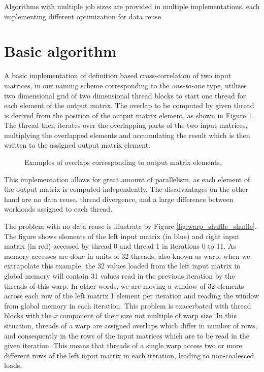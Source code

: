 Algorithms with multiple job sizes are provided in multiple implementations, each implementing different optimization for data reuse.


\section{Basic algorithm}

A basic implementation of definition based cross-correlation of two input matrices, in our naming scheme corresponding to the \textit{one-to-one} type, utilizes two dimensional grid of two dimensional thread blocks to start one thread for each element of the output matrix. The overlap to be computed by given thread is derived from the position of the output matrix element, as shown in Figure \ref{fig:basic_algorithm_overlaps}. The thread then iterates over the overlapping parts of the two input matrices, multiplying the overlapped elements and accumulating the result which is then written to the assigned output matrix element.

\begin{figure}[ht]
	\fontsize{6}{8}\selectfont
	\centering
	\def\svgwidth{0.55\textwidth}
	
	\caption{Examples of overlaps corresponding to output matrix elements.}
	\label{fig:basic_algorithm_overlaps}
\end{figure}

This implementation allows for great amount of parallelism, as each element of the output matrix is computed independently.
The disadvantages on the other hand are no data reuse, thread divergence, and a large difference between workloads assigned to each thread.


The problem with no data reuse is illustrate by Figure \ref{fig:warp_shuffle_shuffle}. The figure shows elements of the left input matrix (in blue) and right input matrix (in red) accessed by thread 0 and thread 1 in iterations 0 to 11. As memory accesses are done in units of 32 threads, also known as warp, when we extrapolate this example, the 32 values loaded from the left input matrix in global memory will contain 31 values read in the previous iteration by the threads of this warp. In other words, we are moving a window of 32 elements across each row of the left matrix 1 element per iteration and reading the window from global memory in each iteration. This problem is exacerbated with thread blocks with the \textit{x} component of their size not multiple of warp size. In this situation, threads of a warp are assigned overlaps which differ in number of rows, and consequently in the rows of the input matrices which are to be read in the given iteration. This means that threads of a single warp access two or more different rows of the left input matrix in each iteration, leading to non-coalesced loads.

